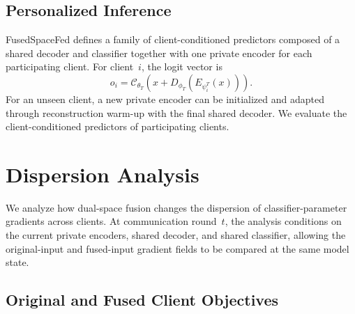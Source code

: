 \documentclass[twoside]{article}
\theoremstyle{thmstyleone}%
\theoremstyle{thmstyletwo}%
\theoremstyle{thmstylethree}%
\begin{document}
\subsection{Personalized Inference}\label{sec:inference}

FusedSpaceFed defines a family of client-conditioned predictors composed of a
shared decoder and classifier together with one private encoder for each
participating client. For client~$i$, the logit vector is
\begin{equation*}
o_i
=
\mathcal{C}_{\theta_T}
\left(
x+D_{\phi_T}\!\left(E_{\psi_i^T}(x)\right)
\right).
\end{equation*}
For an unseen client, a new private encoder can be initialized and adapted
through reconstruction warm-up with the final shared decoder. We evaluate the
client-conditioned predictors of participating clients.




\section{Dispersion Analysis}
\label{sec:theory}

We analyze how dual-space fusion changes the dispersion of
classifier-parameter gradients across clients. At communication round~$t$, the
analysis conditions on the current private encoders, shared decoder, and shared
classifier, allowing the original-input and fused-input gradient fields to be
compared at the same model state.

\subsection{Original and Fused Client Objectives}
\end{document}
